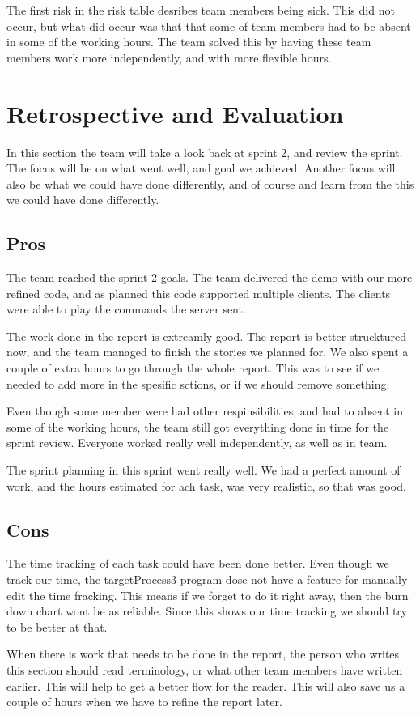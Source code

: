 The first risk in the risk table desribes team members being sick. This did not occur, but what did occur was that that some of team members had to be absent in some of the working hours. 
The team solved this by having these team members work more independently, and with more flexible hours.  

\section{Retrospective and Evaluation}
In this section the team will take a look back at sprint 2, and review the sprint. The focus will be on what went well, and goal we achieved. Another focus will also be what we could have done differently, and of course and learn from the this we could have done differently.

\subsection{Pros}
The team reached the sprint 2 goals. The team delivered the demo with our more refined code, and as planned this code supported multiple clients. The clients were able to play the commands the server sent.

The work done in the report is extreamly good. The report is better strucktured now, and the team managed to finish the stories we planned for. We also spent a couple of extra hours to go through the whole report. This was to see if we needed to add more in the spesific sctions, or if we should remove something.  

Even though some member were had other respinsibilities, and had to absent in some of the working hours, the team still got everything done in time for the sprint review. Everyone worked really well independently, as well as in team. 

The sprint planning in this sprint went really well. We had a perfect amount of work, and the hours estimated for ach task, was very realistic, so that was good. 


\subsection{Cons}
The time tracking of each task could have been done better. 
Even though we track our time, the targetProcess3 program dose not have a feature for manually edit the time fracking. 
This means if we forget to do it right away, then the burn down chart wont be as reliable. Since this shows our time tracking we should try to be better at that.

When there is work that needs to be done in the report, the person who writes this section should read terminology, or what other team members have written earlier. This will help to get a better flow for the reader.
This will also save us a couple of hours when we have to refine the report later. 